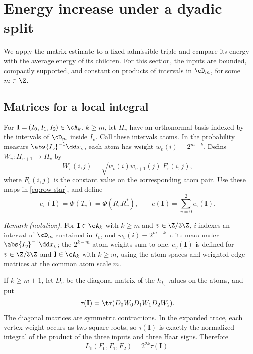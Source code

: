 \section{Energy increase under a dyadic split}\label{sec:dyadic}

We apply the matrix estimate to a fixed admissible triple and compare
its energy with the average energy of its children. For this section,
the inputs are bounded, compactly supported, and constant on products
of intervals in \(\cD_m\), for some \(m\in\Z\).

\subsection{Matrices for a local integral}

For \(\mathbf I=(I_0,I_1,I_2)\in\cA_k\), \(k\ge m\), let \(H_v\)
have an orthonormal basis indexed by the intervals of \(\cD_m\)
inside \(I_v\). Call these intervals atoms. In the probability measure
\(\abs{I_v}^{-1}\dd x_v\), each atom has weight
\(w_v(i)=2^{m-k}\).
Define \(W_v:H_{v+1}\to H_v\) by
\begin{equation}\label{eq:weighted-edge}
 W_v(i,j)=\sqrt{w_v(i)w_{v+1}(j)}\,F_v(i,j),
\end{equation}
where \(F_v(i,j)\) is the constant value on the corresponding atom
pair. Use these maps in \eqref{eq:row-star}, and define
\begin{equation}\label{eq:local-energy}
 e_v(\mathbf I)=\Phi(T_v)=\Phi(R_vR_v^*),
 \qquad e(\mathbf I)=\sum_{v=0}^2 e_v(\mathbf I).
\end{equation}

\noindent\textit{Remark (notation).} For $\mathbf I\in\cA_k$ with $k\ge m$ and $v\in\Z/3\Z$, $i$ indexes an interval of $\cD_m$ contained in $I_v$, and $w_v(i)=2^{m-k}$ is its mass under $\abs{I_v}^{-1}\dd x_v$; the $2^{k-m}$ atom weights sum to one. $e_v(\mathbf I)$ is defined for $v\in\Z/3\Z$ and $\mathbf I\in\cA_k$ with $k\ge m$, using the atom spaces and weighted edge matrices at the common atom scale $m$.


If \(k\ge m+1\), let \(D_v\) be the diagonal matrix of the
\(h_{I_v}\)-values on the atoms, and put
\[
 \tau(\mathbf I)=\tr(D_0W_0D_1W_1D_2W_2).
\]
The diagonal matrices are symmetric contractions. In the expanded
trace, each vertex weight occurs as two square roots, so
\(\tau(\mathbf I)\) is exactly the normalized integral of the product
of the three inputs and three Haar signs. Therefore
\begin{equation}\label{eq:trace-integral}
 L_{\mathbf I}(F_0,F_1,F_2)=2^{2k}\tau(\mathbf I).
\end{equation}

